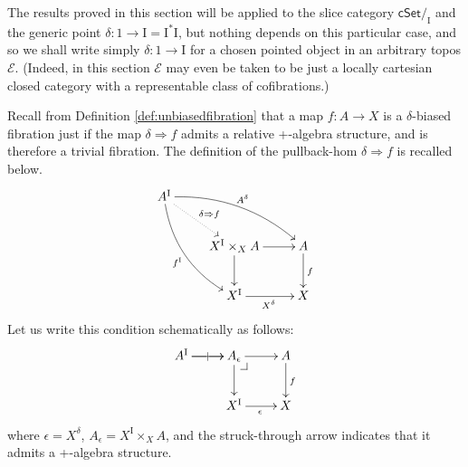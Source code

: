 \documentclass[12pt]{article}
\makeatletter
\newcommand{\EE}{\ensuremath{\mathcal{E}}}
\newcommand{\cSet}{\ensuremath{\mathsf{cSet}}}
\newcommand{\ra}{\ensuremath{\rightarrow}}
\renewcommand{\to}{\ensuremath{\rightarrow}}
\newcommand{\pbh}[2]{#1\!\Rightarrow\!#2}
\newcommand{\I}{\ensuremath{\mathrm{I}}}
\theoremstyle{remark}
\theoremstyle{definition}
\newcommand{\pbcorner}[1][dr]{\save*!/#1-1.2pc/#1:(-1,1)@^{|-}\restore}
\makeatother
\begin{document}
The results proved in this section will be applied to the slice category $\cSet/_\I$ and the generic point $\delta : 1 \ra \I = \I^*\I$, but nothing depends on this particular case, and so we shall write simply $\delta : 1\to \I$ for a chosen pointed object in an arbitrary topos $\EE$.  (Indeed, in this section $\EE$ may even be taken to be just a locally cartesian closed category with a representable class of cofibrations.)

Recall from Definition \ref{def:unbiasedfibration} that a map $f:A\ra X$  is a $\delta$-biased fibration just if the map $\delta \Rightarrow f$ admits a relative +-algebra structure, and is therefore a trivial fibration.  The definition of the pullback-hom $\pbh{\delta}{f}$ is recalled below.
\begin{equation}\label{diagram:frobenius1}
\xymatrix{
A^\I \ar@/_3ex/ [rdd]_{f^\I} \ar@{.>}[rd]^{\delta\Rightarrow{f}} \ar@/^3ex/ [rrd]^{A^{\delta}}  && \\
& X^\I \times_{X} A \ar[d] \ar[r] & A \ar[d]^{f} \\
& X^\I \ar[r]_{X^{\delta}} &  X
}
\end{equation}
Let us write this condition schematically as follows:
\begin{equation}\label{diagram:frobenius1}
\xymatrix{
A^\I \ar[r]|| \ar[r]  & A_\epsilon\ar[d] \pbcorner \ar[r] & A \ar[d]^f \\
& X^\I \ar[r]_{\epsilon} &  X
}
\end{equation}
where $\epsilon = X^{\delta}$, $A_\epsilon = X^\I \times_{X} A$, and the struck-through arrow indicates that it admits a +-algebra structure.
\end{document}
